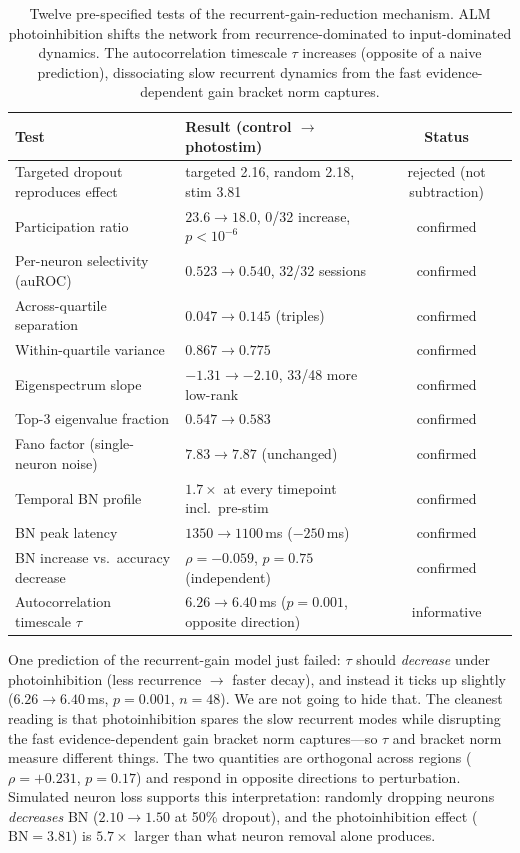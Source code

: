 \documentclass{article}
\begin{document}
\begin{table}[t]
\centering
\caption{Twelve pre-specified tests of the recurrent-gain-reduction mechanism. ALM photoinhibition shifts the network from recurrence-dominated to input-dominated dynamics. The autocorrelation timescale $\tau$ increases (opposite of a naive prediction), dissociating slow recurrent dynamics from the fast evidence-dependent gain bracket norm captures.}
\label{tab:mechanism}
\small
\begin{tabular}{llc}
\toprule
Test & Result (control $\to$ photostim) & Status \\
\midrule
Targeted dropout reproduces effect & targeted 2.16, random 2.18, stim 3.81 & rejected (not subtraction) \\
Participation ratio & $23.6 \to 18.0$, 0/32 increase, $p<10^{-6}$ & confirmed \\
Per-neuron selectivity (auROC) & $0.523 \to 0.540$, 32/32 sessions & confirmed \\
Across-quartile separation & $0.047 \to 0.145$ (triples) & confirmed \\
Within-quartile variance & $0.867 \to 0.775$ & confirmed \\
Eigenspectrum slope & $-1.31 \to -2.10$, 33/48 more low-rank & confirmed \\
Top-3 eigenvalue fraction & $0.547 \to 0.583$ & confirmed \\
Fano factor (single-neuron noise) & $7.83 \to 7.87$ (unchanged) & confirmed \\
Temporal BN profile & $1.7\times$ at every timepoint incl.\ pre-stim & confirmed \\
BN peak latency & $1350 \to 1100$\,ms ($-250$\,ms) & confirmed \\
BN increase vs.\ accuracy decrease & $\rho = -0.059$, $p = 0.75$ (independent) & confirmed \\
Autocorrelation timescale $\tau$ & $6.26 \to 6.40$\,ms ($p = 0.001$, opposite direction) & informative \\
\bottomrule
\end{tabular}
\end{table}

One prediction of the recurrent-gain model just failed: $\tau$ should \emph{decrease} under photoinhibition (less recurrence $\to$ faster decay), and instead it ticks up slightly ($6.26 \to 6.40$\,ms, $p = 0.001$, $n = 48$). We are not going to hide that. The cleanest reading is that photoinhibition spares the slow recurrent modes while disrupting the fast evidence-dependent gain bracket norm captures---so $\tau$ and bracket norm measure different things. The two quantities are orthogonal across regions ($\rho = +0.231$, $p = 0.17$) and respond in opposite directions to perturbation. Simulated neuron loss supports this interpretation: randomly dropping neurons \emph{decreases} BN ($2.10 \to 1.50$ at 50\% dropout), and the photoinhibition effect ($\text{BN} = 3.81$) is $5.7\times$ larger than what neuron removal alone produces.
\end{document}
